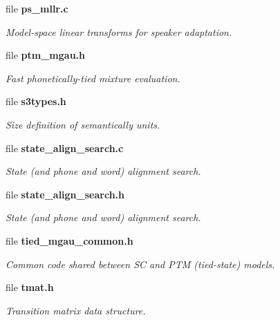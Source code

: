 \begin{DoxyCompactItemize}
file \textbf{ ps\+\_\+mllr.\+c}
\begin{DoxyCompactList}\small\item\em Model-\/space linear transforms for speaker adaptation. \end{DoxyCompactList}\item 
file \textbf{ ptm\+\_\+mgau.\+h}
\begin{DoxyCompactList}\small\item\em Fast phonetically-\/tied mixture evaluation. \end{DoxyCompactList}\item 
file \textbf{ s3types.\+h}
\begin{DoxyCompactList}\small\item\em Size definition of semantically units. \end{DoxyCompactList}\item 
file \textbf{ state\+\_\+align\+\_\+search.\+c}
\begin{DoxyCompactList}\small\item\em State (and phone and word) alignment search. \end{DoxyCompactList}\item 
file \textbf{ state\+\_\+align\+\_\+search.\+h}
\begin{DoxyCompactList}\small\item\em State (and phone and word) alignment search. \end{DoxyCompactList}\item 
file \textbf{ tied\+\_\+mgau\+\_\+common.\+h}
\begin{DoxyCompactList}\small\item\em Common code shared between SC and P\+TM (tied-\/state) models. \end{DoxyCompactList}\item 
file \textbf{ tmat.\+h}
\begin{DoxyCompactList}\small\item\em Transition matrix data structure. \end{DoxyCompactList}\end{DoxyCompactItemize}

